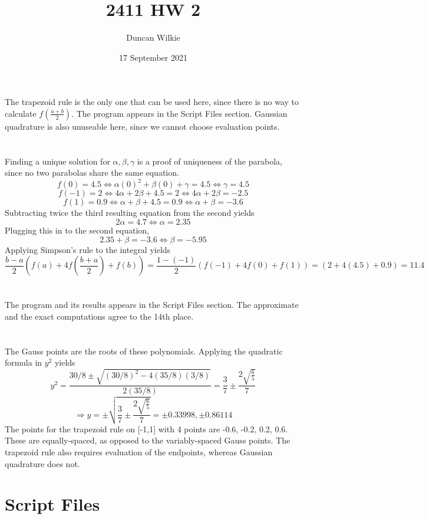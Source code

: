 \documentclass{article}
\title{2411 HW 2}
\author{Duncan Wilkie}
\date{17 September 2021}
\begin{document}
\maketitle

\section{}
The trapezoid rule is the only one that can be used here, since there is no way to calculate $f(\frac{a+b}{2})$.
The program appears in the Script Files section.
Gaussian quadrature is also unuseable here, since we cannot choose evaluation points.
\section{}
Finding a unique solution for $\alpha, \beta, \gamma$ is a proof of uniqueness of the parabola, since no two parabolas share the same equation.
\[f(0)=4.5\Leftrightarrow \alpha(0)^2+\beta(0)+\gamma = 4.5 \Leftrightarrow \gamma = 4.5\]
\[f(-1)=2\Leftrightarrow 4\alpha+2\beta + 4.5 = 2\Leftrightarrow 4\alpha+2\beta = -2.5\]
\[f(1)=0.9\Leftrightarrow \alpha+\beta + 4.5 = 0.9 \Leftrightarrow \alpha+\beta=-3.6\]
Subtracting twice the third resulting equation from the second yields
\[2\alpha = 4.7 \Leftrightarrow \alpha = 2.35\]
Plugging this in to the second equation,
\[2.35+\beta = -3.6\Leftrightarrow \beta = -5.95\]
Applying Simpson's rule to the integral yields
\[\frac{b-a}{2}\left(f(a)+4f\left(\frac{b+a}{2}\right)+f(b)\right)=\frac{1-(-1)}{2}\left(f(-1)+4f(0)+f(1)\right)=\left(2+4(4.5)+0.9\right)=11.4\]
\section{}
The program and its results appears in the Script Files section. The approximate and the exact computations agree to the 14th place.
\section{}
The Gauss points are the roots of these polynomials. Applying the quadratic formula in $y^2$ yields
\[y^2=\frac{30/8\pm\sqrt{(30/8)^2-4(35/8)(3/8)}}{2(35/8)}=\frac{3}{7}\pm\frac{2\sqrt{\frac{6}{5}}}{7}\]
\[\Rightarrow y = \pm\sqrt{\frac{3}{7}\pm\frac{2\sqrt{\frac{6}{5}}}{7}}=\pm0.33998, \pm0.86114\]
The points for the trapezoid rule on [-1,1] with 4 points are -0.6, -0.2, 0.2, 0.6. These are equally-spaced, as opposed to the variably-spaced Gauss points.
The trapezoid rule also requires evaluation of the endpoints, whereas Gaussian quadrature does not.

\section*{Script Files}
\end{document}
